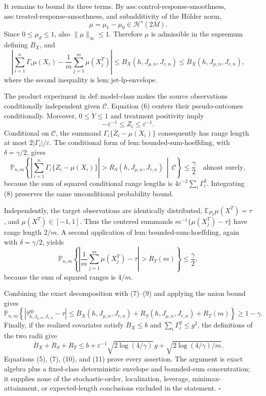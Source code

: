 It remains to bound its three terms.  By
\(\mathrm{ass:control\text{-}response\text{-}smoothness}\),
\(\mathrm{ass:treated\text{-}response\text{-}smoothness}\), and subadditivity of
the H\"older norm,
\[
\mu=\mu_1-\mu_0\in\mathcal H^s(2M).
\]
Since \(0\le\mu_d\le1\), also \(\|\mu\|_\infty\le1\).  Therefore \(\mu\) is
admissible in the supremum defining \(B_X\), and
\[
\left|\sum_{i=1}^n\Gamma_i\mu(X_i)
-\frac1m\sum_{j=1}^m\mu(X_j^T)\right|
\le B_X(h,J_{\mu,n},J_{r,n})
\le\overline B_X(h,J_{\mu,n},J_{r,n}),
\tag{7}
\]
where the second inequality is
\(\mathrm{lem:jet\text{-}lp\text{-}envelope}\).

The product experiment in \(\mathrm{def:model\text{-}class}\) makes the source
observations conditionally independent given \(\mathcal C\).  Equation (6) centers
their pseudo-outcomes conditionally.  Moreover, \(0\le Y\le1\) and treatment
positivity imply
\[
-\varepsilon^{-1}\le Z_i\le\varepsilon^{-1}.
\]
Conditional on \(\mathcal C\), the summand
\(\Gamma_i\{Z_i-\mu(X_i)\}\) consequently has range length at most
\(2|\Gamma_i|/\varepsilon\).  The conditional form of
\(\mathrm{lem:bounded\text{-}sum\text{-}hoeffding}\), with
\(\delta=\gamma/2\), gives
\[
\mathbb P_{n,m}\!\left\{
\left|\sum_{i=1}^n\Gamma_i\{Z_i-\mu(X_i)\}\right|
>R_S(h,J_{\mu,n},J_{r,n})\,\middle|\,\mathcal C\right\}
\le\frac\gamma2
\quad\text{almost surely},
\tag{8}
\]
because the sum of squared conditional range lengths is
\(4\varepsilon^{-2}\sum_i\Gamma_i^2\).  Integrating (8) preserves the same
unconditional probability bound.

Independently, the target observations are identically distributed,
\(\mathbb E_{P_T}\mu(X^T)=\tau\), and \(\mu(X^T)\in[-1,1]\).  Thus the centered
summands \(m^{-1}\{\mu(X_j^T)-\tau\}\) have range length \(2/m\).  A second
application of \(\mathrm{lem:bounded\text{-}sum\text{-}hoeffding}\), again with
\(\delta=\gamma/2\), yields
\[
\mathbb P_{n,m}\!\left\{
\left|\frac1m\sum_{j=1}^m\mu(X_j^T)-\tau\right|>R_T(m)
\right\}\le\frac\gamma2,
\tag{9}
\]
because the sum of squared ranges is \(4/m\).

Combining the exact decomposition with (7)--(9) and applying the union bound gives
\[
\mathbb P_{n,m}\!\left\{
\left|\widehat\tau^{\mathrm{sp}}_{h,J_{\mu,n},J_{r,n}}-\tau\right|
\le\overline B_X(h,J_{\mu,n},J_{r,n})
+R_S(h,J_{\mu,n},J_{r,n})+R_T(m)
\right\}\ge1-\gamma.
\tag{10}
\]
Finally, if the realized covariates satisfy \(\overline B_X\le b\) and
\(\sum_i\Gamma_i^2\le g^2\), the definitions of the two radii give
\[
\overline B_X+R_S+R_T
\le b+\varepsilon^{-1}\sqrt{2\log(4/\gamma)}\,g
+\sqrt{2\log(4/\gamma)/m}.
\tag{11}
\]
Equations (5), (7), (10), and (11) prove every assertion.  The argument is exact
algebra plus a fixed-class deterministic envelope and bounded-sum concentration;
it supplies none of the stochastic-order, localization, leverage,
minimax-attainment, or expected-length conclusions excluded in the statement.
\(\square\)